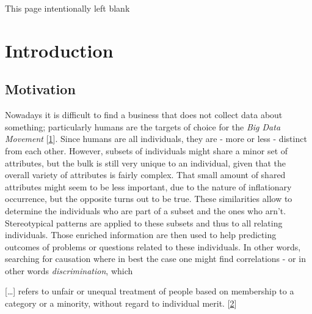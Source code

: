 \documentclass[12pt,english,a4paper,titlepage,cleardoublepage=empty,dottedtoc]{report}
\let\origquote\quote
\let\endorigquote\endquote
\renewenvironment{quote}{%
    \origquote
    \itshape
}
{\endorigquote}
\begin{document}
{
\setcounter{tocdepth}{1}
\pagestyle{plain}
\tableofcontents
}
\newpage
{}
\listoftables
\newpage
{}
\listoffigures
\newpage
\newpage

\begin{center}
\thispagestyle{empty}
\setcounter{page}{0}
This page intentionally left blank
\end{center}\newpage

\chapter{Introduction}\label{introduction}

\section{Motivation}\label{motivation}

Nowadays it is difficult to find a business that does not collect data
about something; particularly humans are the targets of choice for the
\emph{Big Data Movement}
{[}\protect\hyperlink{ref-web_2016_privacy-international-about-big-data}{1}{]}.
Since humans are all individuals, they are - more or less - distinct
from each other. However, subsets of individuals might share a minor set
of attributes, but the bulk is still very unique to an individual, given
that the overall variety of attributes is fairly complex. That small
amount of shared attributes might seem to be less important, due to the
nature of inflationary occurrence, but the opposite turns out to be
true. These similarities allow to determine the individuals who are part
of a subset and the ones who arn't. Stereotypical patterns are applied
to these subsets and thus to all relating individuals. Those enriched
information are then used to help predicting outcomes of problems or
questions related to these individuals. In other words, searching for
causation where in best the case one might find correlations - or in
other words \emph{discrimination}, which

\begin{quote}
{[}\ldots{}{]} refers to unfair or unequal treatment of people based on
membership to a category or a minority, without regard to individual
merit.
{[}\protect\hyperlink{ref-paper_2008_discrimination-aware-data-mining}{2}{]}
\end{quote}
\end{document}
